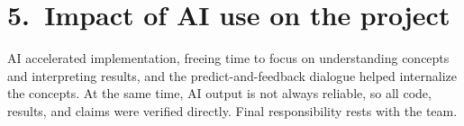 \documentclass[10pt,a4paper]{article}
\begin{document}
\section*{5.\ Impact of AI use on the project}
AI accelerated implementation, freeing time to focus on understanding concepts and interpreting results, and the predict-and-feedback dialogue helped internalize the concepts. At the same time, AI output is not always reliable, so all code, results, and claims were verified directly. Final responsibility rests with the team.
\end{document}
